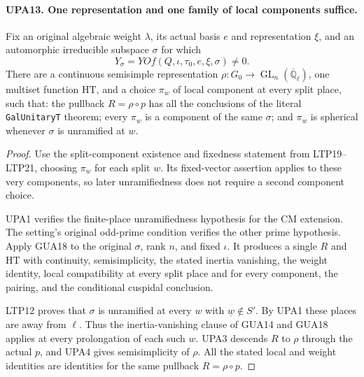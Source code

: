 \documentclass[11pt,a4paper]{article}
\numberwithin{equation}{section}
\theoremstyle{remark}\newtheorem{remark}[theorem]{Remark}
\begin{document}
\paragraph{UPA13. One representation and one family of local components suffice.}
\label{claim:UPA13}
Fix an original algebraic weight $\lambda$, its actual basis
$e$ and representation $\xi$, and an automorphic irreducible
subspace $\sigma$ for which
\[
                         Y_\sigma=YOf(Q,\iota,\tau_0,e,\xi,\sigma)
                                      \ne0.
 \tag{UPA.19}
\]
There are a continuous semisimple representation
$\rho:G_0\to\operatorname{GL}_n(\overline{\mathbb Q}_\ell)$,
one multiset function $\mathrm{HT}$, and a choice
$\pi_w$ of local component at every split place, such that:
the pullback $R=\rho\circ p$ has all the conclusions of
the literal \texttt{Gal\allowbreak Unitary\allowbreak T} theorem; every $\pi_w$
is a component of the same $\sigma$; and $\pi_w$ is spherical
whenever $\sigma$ is unramified at $w$.
\begin{proof}
Use the split-component existence and fixedness statement
from LTP19--LTP21, choosing $\pi_w$ for
each split $w$.  Its fixed-vector assertion applies to
these very components, so later unramifiedness does not
require a second component choice.

UPA1 verifies the finite-place unramifiedness hypothesis
for the CM extension.  The setting's original odd-prime
condition verifies the other prime hypothesis.  Apply
GUA18 to the original $\sigma$,
rank $n$, and fixed $\iota$.  It produces a single $R$
and $\mathrm{HT}$ with continuity, semisimplicity,
the stated inertia vanishing, the weight identity,
local compatibility at every split place and for every
component, the pairing, and the conditional cuspidal
conclusion.

LTP12 proves that $\sigma$ is
unramified at every $w$ with $\underline w\notin S'$.
By UPA1 these places are away from $\ell$.  Thus the
inertia-vanishing clause of GUA14 and GUA18
applies at every prolongation of each such $w$.
UPA3 descends $R$ to $\rho$ through the actual $p$,
and UPA4 gives semisimplicity of $\rho$.
All the stated local and weight identities are
identities for the same pullback $R=\rho\circ p$.
\end{proof}

\end{document}
